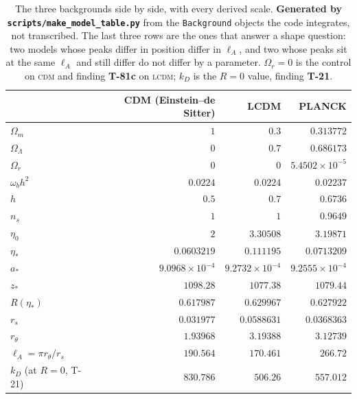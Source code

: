 \begin{table}[htbp]
\centering\small
\captionsetup{width=0.76\linewidth,justification=raggedright,singlelinecheck=false}
\caption{The three backgrounds side by side, with every derived scale. \textbf{Generated by \texttt{scripts/make\_model\_table.py}} from the \texttt{Background} objects the code integrates, not transcribed. The last three rows are the ones that answer a shape question: two models whose peaks differ in position differ in $\ell_A$, and two whose peaks sit at the same $\ell_A$ and still differ do not differ by a parameter. $\Omega_r=0$ is the control on \textsc{cdm} and finding \textbf{T-81c} on \textsc{lcdm}; $k_D$ is the $R=0$ value, finding \textbf{T-21}.}
\label{tab:model-parameters}
\begin{tabular}{lrrr}
\toprule
 & CDM (Einstein--de Sitter) & LCDM & PLANCK \\
\midrule
$\Omega_m$ & $1$ & $0.3$ & $0.313772$ \\
$\Omega_\Lambda$ & $0$ & $0.7$ & $0.686173$ \\
$\Omega_r$ & $0$ & $0$ & $5.4502\times10^{-5}$ \\
$\omega_b h^2$ & $0.0224$ & $0.0224$ & $0.02237$ \\
$h$ & $0.5$ & $0.7$ & $0.6736$ \\
$n_s$ & $1$ & $1$ & $0.9649$ \\
$\eta_0$ & $2$ & $3.30508$ & $3.19871$ \\
$\eta_*$ & $0.0603219$ & $0.111195$ & $0.0713209$ \\
$a_*$ & $9.0968\times10^{-4}$ & $9.2732\times10^{-4}$ & $9.2555\times10^{-4}$ \\
$z_*$ & $1098.28$ & $1077.38$ & $1079.44$ \\
$R(\eta_*)$ & $0.617987$ & $0.629967$ & $0.627922$ \\
$r_s$ & $0.031977$ & $0.0588631$ & $0.0368363$ \\
$r_\theta$ & $1.93968$ & $3.19388$ & $3.12739$ \\
$\ell_A=\pi r_\theta/r_s$ & $190.564$ & $170.461$ & $266.72$ \\
$k_D$ (at $R=0$, T-21) & $830.786$ & $506.26$ & $557.012$ \\
\bottomrule
\end{tabular}
\end{table}
